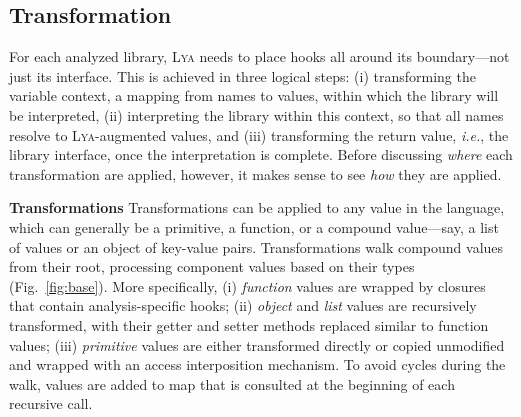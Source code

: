 \documentclass[letterpaper,twocolumn,10pt]{article}
\def\ie{{\em i.e.}, }
\newcommand{\heading}[1]{\vspace{2pt}\noindent\textbf{#1}\enspace}
\newcommand{\sys}{{\scshape Lya}\xspace}
\begin{document}
\subsection{Transformation}
\label{two}

For each analyzed library, \sys needs to place hooks all around its boundary---not just its interface.
This is achieved in three logical steps:
(i) transforming the variable context, a mapping from names to values, within which the library will be interpreted,
(ii) interpreting the library within this context, so that all names resolve to \sys-augmented values, and
(iii) transforming the return value, \ie the library interface, once the interpretation is complete.
Before discussing \emph{where} each transformation are applied, however, it makes sense to see \emph{how} they are applied.

\heading{Transformations}
Transformations can be applied to any value in the language, which can generally be a primitive, a function, or a compound value---say, a list of values or an object of key-value pairs.
Transformations walk compound values from their root, processing component values based on their types (Fig.~\ref{fig:base}).
More specifically,
  (i) \emph{function} values are wrapped by closures that contain analysis-specific hooks; %
  (ii) \emph{object} and \emph{list} values are recursively transformed, with their getter and setter methods replaced similar to function values; %
  (iii) \emph{primitive} values are either transformed directly or copied unmodified and wrapped with an access interposition mechanism.
To avoid cycles during the walk, values are added to map that is consulted at the beginning of each recursive call.
\end{document}

